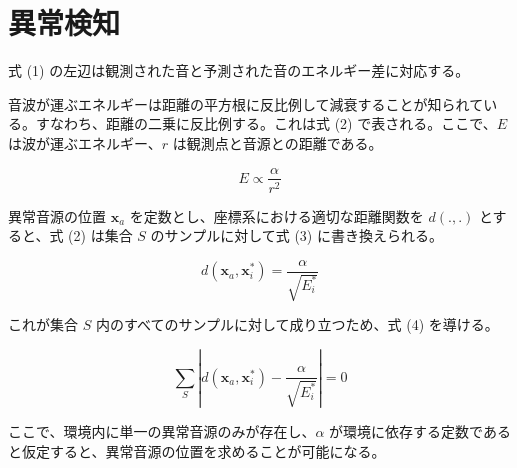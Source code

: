 \documentclass[../main]{subfiles}
\begin{document}
\section{異常検知}
\label{sec:pmethod_anomaly_detection}

式 (1) の左辺は観測された音と予測された音のエネルギー差に対応する。

音波が運ぶエネルギーは距離の平方根に反比例して減衰することが知られている。すなわち、距離の二乗に反比例する。これは式 (2) で表される。ここで、$E$ は波が運ぶエネルギー、$r$ は観測点と音源との距離である。

\begin{equation}
    E \propto \frac{\alpha}{r^2} \tag{2}
\end{equation}

異常音源の位置 $\mathbf{x}_a$ を定数とし、座標系における適切な距離関数を $d(., .)$ とすると、式 (2) は集合 $S$ のサンプルに対して式 (3) に書き換えられる。

\begin{equation}
    d(\mathbf{x}_a, \mathbf{x}_i^*) = \frac{\alpha}{\sqrt{E_i^*}} \tag{3}
\end{equation}

これが集合 $S$ 内のすべてのサンプルに対して成り立つため、式 (4) を導ける。

\begin{equation}
    \sum_{S} \left| d(\mathbf{x}_a, \mathbf{x}_i^*) - \frac{\alpha}{\sqrt{E_i^*}} \right| = 0 \tag{4}
\end{equation}

ここで、環境内に単一の異常音源のみが存在し、$\alpha$ が環境に依存する定数であると仮定すると、異常音源の位置を求めることが可能になる。
\end{document}
